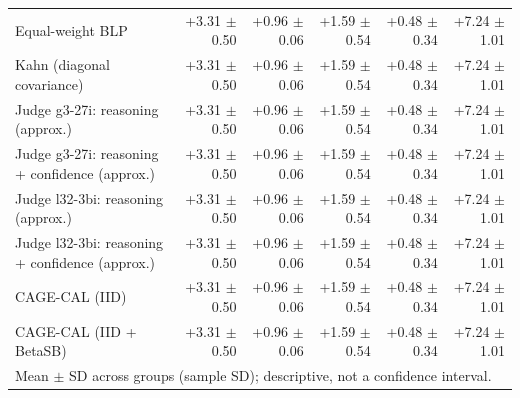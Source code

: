 \begin{tabular}{lrrrrr}
Equal-weight BLP & +3.31 {\scriptsize $\pm$ 0.50} & +0.96 {\scriptsize $\pm$ 0.06} & +1.59 {\scriptsize $\pm$ 0.54} & +0.48 {\scriptsize $\pm$ 0.34} & +7.24 {\scriptsize $\pm$ 1.01} \\
Kahn (diagonal covariance) & +3.31 {\scriptsize $\pm$ 0.50} & +0.96 {\scriptsize $\pm$ 0.06} & +1.59 {\scriptsize $\pm$ 0.54} & +0.48 {\scriptsize $\pm$ 0.34} & +7.24 {\scriptsize $\pm$ 1.01} \\
Judge g3-27i: reasoning (approx.) & +3.31 {\scriptsize $\pm$ 0.50} & +0.96 {\scriptsize $\pm$ 0.06} & +1.59 {\scriptsize $\pm$ 0.54} & +0.48 {\scriptsize $\pm$ 0.34} & +7.24 {\scriptsize $\pm$ 1.01} \\
Judge g3-27i: reasoning + confidence (approx.) & +3.31 {\scriptsize $\pm$ 0.50} & +0.96 {\scriptsize $\pm$ 0.06} & +1.59 {\scriptsize $\pm$ 0.54} & +0.48 {\scriptsize $\pm$ 0.34} & +7.24 {\scriptsize $\pm$ 1.01} \\
Judge l32-3bi: reasoning (approx.) & +3.31 {\scriptsize $\pm$ 0.50} & +0.96 {\scriptsize $\pm$ 0.06} & +1.59 {\scriptsize $\pm$ 0.54} & +0.48 {\scriptsize $\pm$ 0.34} & +7.24 {\scriptsize $\pm$ 1.01} \\
Judge l32-3bi: reasoning + confidence (approx.) & +3.31 {\scriptsize $\pm$ 0.50} & +0.96 {\scriptsize $\pm$ 0.06} & +1.59 {\scriptsize $\pm$ 0.54} & +0.48 {\scriptsize $\pm$ 0.34} & +7.24 {\scriptsize $\pm$ 1.01} \\
CAGE-CAL (IID) & +3.31 {\scriptsize $\pm$ 0.50} & +0.96 {\scriptsize $\pm$ 0.06} & +1.59 {\scriptsize $\pm$ 0.54} & +0.48 {\scriptsize $\pm$ 0.34} & +7.24 {\scriptsize $\pm$ 1.01} \\
CAGE-CAL (IID + BetaSB) & +3.31 {\scriptsize $\pm$ 0.50} & +0.96 {\scriptsize $\pm$ 0.06} & +1.59 {\scriptsize $\pm$ 0.54} & +0.48 {\scriptsize $\pm$ 0.34} & +7.24 {\scriptsize $\pm$ 1.01} \\
\bottomrule
\multicolumn{6}{l}{\scriptsize Mean $\pm$ SD across groups (sample SD); descriptive, not a confidence interval.} \\
\end{tabular}
